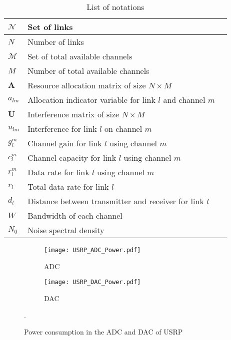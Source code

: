 \documentclass[conference]{IEEEtran}
\begin{document}
\begin{table}[b]
\caption{List of notations}
\centering
\begin{tabular}{|M{0.7cm}|M{0.39\textwidth}|N}
  \hline
  $\mathcal{N}$ & Set of links &\\[3pt]
  \hline
  $N$ & Number of links &\\[3pt]
  \hline
  $\mathcal{M}$ & Set of total available channels &\\[3pt]
  \hline
  $M$ & Number of total available channels &\\[3pt]
  \hline
  $\textbf{A}$ & Resource allocation matrix of size $N\times M$ &\\[3pt]
  \hline
  $a_{lm}$ & Allocation indicator variable for link $l$ and channel $m$&\\[3pt]
  \hline
  $\textbf{U}$ & Interference matrix of size $N\times M$ &\\[3pt]
  \hline
  $u_{lm}$ & Interference for link $l$ on channel $m$&\\[3pt]
  \hline
  $g_l^m$ & Channel gain for link $l$ using channel $m$&\\[3pt]
  \hline
  $c_l^m$ & Channel capacity for link $l$ using channel $m$&\\[3pt]
  \hline
  $r_l^m$ & Data rate for link $l$ using channel $m$&\\[3pt]
  \hline
  $r_l$ & Total data rate for link $l$ &\\[3pt]
  \hline
  $d_l$ & Distance between transmitter and receiver for link $l$ &\\[3pt]
  \hline
  $W$ & Bandwidth of each channel&\\[3pt]
  \hline
  $N_0$ & Noise spectral density&\\[3pt]
  \hline
\end{tabular}
\label{table:param}
\end{table}
\begin{figure}
        \centering
        \begin{subfigure}[b]{0.24\textwidth}
                \texttt{[image: USRP\_ADC\_Power.pdf]}
                \caption{ADC}
                \label{fig:adc}
        \end{subfigure}\begin{subfigure}[b]{0.24\textwidth}
                \texttt{[image: USRP\_DAC\_Power.pdf]}
                \caption{DAC}
                \label{fig:dac}
        \end{subfigure}
        \caption{Power consumption in the ADC and DAC of USRP  \cite{Nazmul_NCOFDM1, ad9777, ads62, dac3162, ads4249}}\label{fig:syspower}.
\end{figure}
\end{document}
